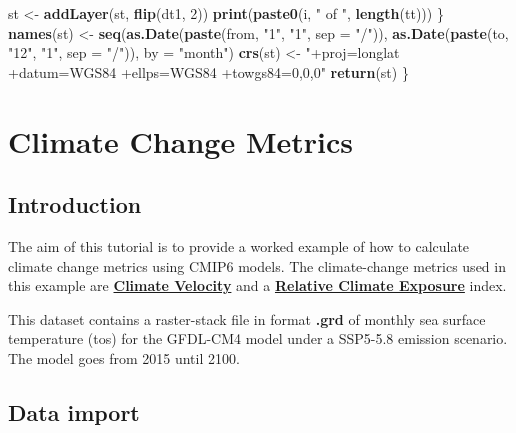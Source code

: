 \documentclass[]{book}
\newenvironment{Shaded}{\begin{snugshade}}{\end{snugshade}}
\newcommand{\DataTypeTok}[1]{\textcolor[rgb]{0.13,0.29,0.53}{#1}}
\newcommand{\DecValTok}[1]{\textcolor[rgb]{0.00,0.00,0.81}{#1}}
\newcommand{\KeywordTok}[1]{\textcolor[rgb]{0.13,0.29,0.53}{\textbf{#1}}}
\newcommand{\NormalTok}[1]{#1}
\newcommand{\StringTok}[1]{\textcolor[rgb]{0.31,0.60,0.02}{#1}}
\begin{document}
\begin{Shaded}
\begin{Highlighting}[]
\NormalTok{      st <-}\StringTok{ }\KeywordTok{addLayer}\NormalTok{(st, }\KeywordTok{flip}\NormalTok{(dt1, }\DecValTok{2}\NormalTok{))}
      \KeywordTok{print}\NormalTok{(}\KeywordTok{paste0}\NormalTok{(i, }\StringTok{" of "}\NormalTok{, }\KeywordTok{length}\NormalTok{(tt)))}
\NormalTok{    \}}
    \KeywordTok{names}\NormalTok{(st) <-}\StringTok{ }\KeywordTok{seq}\NormalTok{(}\KeywordTok{as.Date}\NormalTok{(}\KeywordTok{paste}\NormalTok{(from, }\StringTok{"1"}\NormalTok{, }\StringTok{"1"}\NormalTok{, }\DataTypeTok{sep =} \StringTok{"/"}\NormalTok{)), }
                     \KeywordTok{as.Date}\NormalTok{(}\KeywordTok{paste}\NormalTok{(to, }\StringTok{"12"}\NormalTok{, }\StringTok{"1"}\NormalTok{, }\DataTypeTok{sep =} \StringTok{"/"}\NormalTok{)), }\DataTypeTok{by =} \StringTok{"month"}\NormalTok{)}
    \KeywordTok{crs}\NormalTok{(st) <-}\StringTok{ "+proj=longlat +datum=WGS84 +ellps=WGS84 +towgs84=0,0,0"}
    \KeywordTok{return}\NormalTok{(st)}
\NormalTok{    \}}
\end{Highlighting}
\end{Shaded}

\hypertarget{climate-change-metrics}{%
\chapter{Climate Change Metrics}\label{climate-change-metrics}}

\hypertarget{introduction-1}{%
\section{Introduction}\label{introduction-1}}

The aim of this tutorial is to provide a worked example of how to calculate climate change metrics using CMIP6 models. The climate-change metrics used in this example are \href{https://science.sciencemag.org/content/334/6056/652.abstract}{\textbf{Climate Velocity}} and a \href{https://www.researchsquare.com/article/rs-421078/v1}{\textbf{Relative Climate Exposure}} index.

This dataset contains a raster-stack file in format \textbf{.grd} of monthly sea surface temperature (tos) for the GFDL-CM4 model under a SSP5-5.8 emission scenario. The model goes from 2015 until 2100.

\hypertarget{data-import-1}{%
\section{Data import}\label{data-import-1}}
\end{document}
